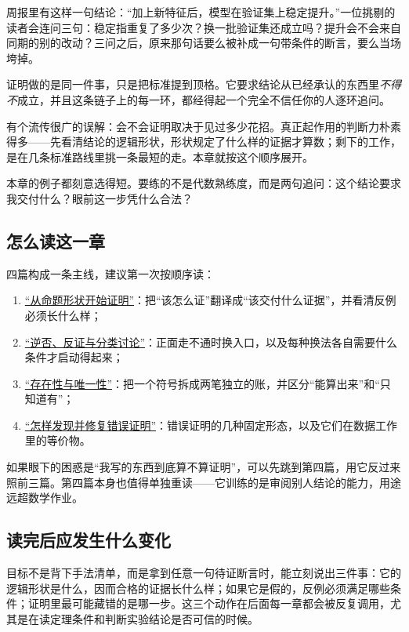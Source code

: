 周报里有这样一句结论：``加上新特征后，模型在验证集上稳定提升。''一位挑剔的读者会连问三句：稳定指重复了多少次？换一批验证集还成立吗？提升会不会来自同期的别的改动？三问之后，原来那句话要么被补成一句带条件的断言，要么当场垮掉。

证明做的是同一件事，只是把标准提到顶格。它要求结论从已经承认的东西里\emph{不得不}成立，并且这条链子上的每一环，都经得起一个完全不信任你的人逐环追问。

有个流传很广的误解：会不会证明取决于见过多少花招。真正起作用的判断力朴素得多——先看清结论的逻辑形状，形状规定了什么样的证据才算数；剩下的工作，是在几条标准路线里挑一条最短的走。本章就按这个顺序展开。

本章的例子都刻意选得短。要练的不是代数熟练度，而是两句追问：这个结论要求我交付什么？眼前这一步凭什么合法？

\subsection{怎么读这一章}

四篇构成一条主线，建议第一次按顺序读：

\begin{enumerate}
\tightlist
\item \hyperref[sec:01-Mathematical-Language/03-Proof-Techniques/01]{``从命题形状开始证明''}：把``该怎么证''翻译成``该交付什么证据''，并看清反例必须长什么样；
\item \hyperref[sec:01-Mathematical-Language/03-Proof-Techniques/02]{``逆否、反证与分类讨论''}：正面走不通时换入口，以及每种换法各自需要什么条件才启动得起来；
\item \hyperref[sec:01-Mathematical-Language/03-Proof-Techniques/03]{``存在性与唯一性''}：把一个符号拆成两笔独立的账，并区分``能算出来''和``只知道有''；
\item \hyperref[sec:01-Mathematical-Language/03-Proof-Techniques/04]{``怎样发现并修复错误证明''}：错误证明的几种固定形态，以及它们在数据工作里的等价物。
\end{enumerate}

如果眼下的困惑是``我写的东西到底算不算证明''，可以先跳到第四篇，用它反过来照前三篇。第四篇本身也值得单独重读——它训练的是审阅别人结论的能力，用途远超数学作业。

\subsection{读完后应发生什么变化}

目标不是背下手法清单，而是拿到任意一句待证断言时，能立刻说出三件事：它的逻辑形状是什么，因而合格的证据长什么样；如果它是假的，反例必须满足哪些条件；证明里最可能藏错的是哪一步。这三个动作在后面每一章都会被反复调用，尤其是在读定理条件和判断实验结论是否可信的时候。
